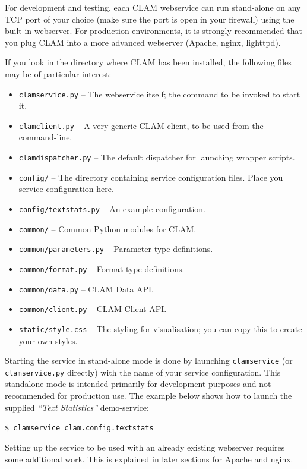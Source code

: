 \documentclass[a4paper,12pt,twoside,openright]{report}
\begin{document}
For development and testing, each CLAM webservice can run stand-alone on any
TCP port of your choice (make sure the port is open in your firewall) using the
built-in webserver. For production environments, it is strongly recommended
that you plug CLAM into a more advanced webserver (Apache, nginx, lighttpd). 

If you look in the directory where CLAM has been installed, the following files
may be of particular interest:

\begin{itemize}
\item \texttt{clamservice.py} -- The webservice itself; the command to be invoked to start it.
\item \texttt{clamclient.py} -- A very generic CLAM client, to be used from the command-line.
\item \texttt{clamdispatcher.py} -- The default dispatcher for launching wrapper scripts.
\item \texttt{config/} -- The directory containing service configuration files. Place you service configuration here.
\item \texttt{config/textstats.py} -- An example configuration.
\item \texttt{common/} -- Common Python modules for CLAM.
\item \texttt{common/parameters.py} -- Parameter-type definitions.
\item \texttt{common/format.py} -- Format-type definitions.
\item \texttt{common/data.py} -- CLAM Data API.
\item \texttt{common/client.py} -- CLAM Client API.
\item \texttt{static/style.css} -- The styling for visualisation; you can copy this to create your own styles.
\end{itemize}

Starting the service in stand-alone mode is done by launching
\texttt{clamservice} (or \texttt{clamservice.py} directly) with the name of your service
configuration. This standalone mode is intended primarily for development
purposes and not recommended for production use. The example below shows how to
launch the supplied \emph{``Text Statistics''} demo-service:

\texttt{\$ clamservice clam.config.textstats}

Setting up the service to be used with an already existing webserver requires
some additional work. This is explained in later sections for Apache and nginx.
\end{document}
